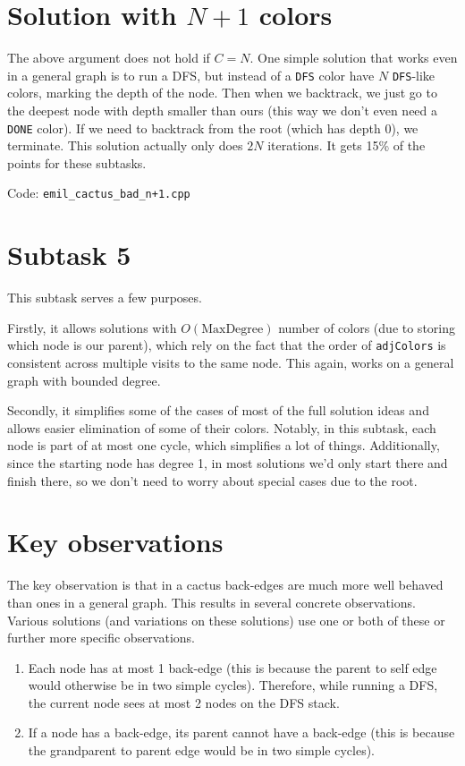 \documentclass{article}
\begin{document}
\section{Solution with $N+1$ colors}

The above argument does not hold if $C = N$. One simple solution that works even in a general graph is to run a DFS, but instead of a \verb|DFS| color have $N$ \verb|DFS|-like colors, marking the depth of the node. Then when we backtrack, we just go to the deepest node with depth smaller than ours (this way we don't even need a \verb|DONE| color). If we need to backtrack from the root (which has depth $0$), we terminate. This solution actually only does $2N$ iterations. It gets 15\% of the points for these subtasks.

Code: \verb|emil_cactus_bad_n+1.cpp|

\section{Subtask 5}

This subtask serves a few purposes.

Firstly, it allows solutions with $O(\mathrm{MaxDegree})$ number of colors (due to storing which node is our parent), which rely on the fact that the order of \verb|adjColors| is consistent across multiple visits to the same node. This again, works on a general graph with bounded degree.

Secondly, it simplifies some of the cases of most of the full solution ideas and allows easier elimination of some of their colors. Notably, in this subtask, each node is part of at most one cycle, which simplifies a lot of things. Additionally, since the starting node has degree 1, in most solutions we'd only start there and finish there, so we don't need to worry about special cases due to the root.

\section{Key observations}

The key observation is that in a cactus back-edges are much more well behaved than ones in a general graph. This results in several concrete observations. Various solutions (and variations on these solutions) use one or both of these or further more specific observations.

\begin{enumerate}

\item Each node has at most 1 back-edge (this is because the parent to self edge would otherwise be in two simple cycles). Therefore, while running a DFS, the current node sees at most 2 nodes on the DFS stack.

\item If a node has a back-edge, its parent cannot have a back-edge (this is because the grandparent to parent edge would be in two simple cycles).

\end{enumerate}
\end{document}
